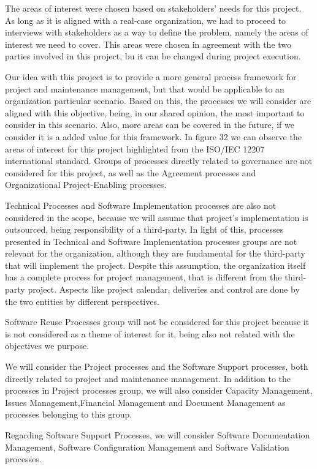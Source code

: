 The areas of interest were chosen based on stakeholders' needs for this project. As long as it is aligned with a real-case organization, we had to proceed to interviews with stakeholders as a way to define the problem, namely the areas of interest we need to cover. This areas were chosen in agreement with the two parties involved in this project, bu it can be changed during project execution.\par
Our idea with this project is to provide a more general process framework for project and maintenance management, but that would be applicable to an organization particular scenario. Based on this, the processes we will consider are aligned with this objective, being, in our shared opinion, the most important to consider in this scenario. Also, more areas can be covered in the future, if we consider it is a added value for this framework.  
In figure 32 we can observe the areas of interest for this project highlighted from the ISO/IEC 12207 international standard. Groups of processes directly related to governance are not considered for this project, as well as the Agreement processes and Organizational Project-Enabling processes.\par
Technical Processes and Software Implementation processes are also not considered in the scope, because we will assume that project's implementation is outsourced, being responsibility of a third-party. In light of this, processes presented in Technical and Software Implementation processes groups are not relevant for the organization, although they are fundamental for the third-party that will implement the project. Despite this assumption, the organization itself has a complete process for project management, that is different from the third-party project. Aspects like project calendar, deliveries and control are done by the two entities by different perspectives.\par
Software Reuse Processes group will not be considered for this project because it is not considered as a theme of interest for it, being also not related with the objectives we purpose.\par
We will consider the Project processes and the Software Support processes, both directly related to project and maintenance management. In addition to the processes in Project processes group, we will also consider Capacity Management, Issues Management,Financial Management and Document Management as processes belonging to this group.\par
Regarding Software Support Processes, we will consider Software Documentation Management, Software Configuration Management and Software Validation processes.\par


